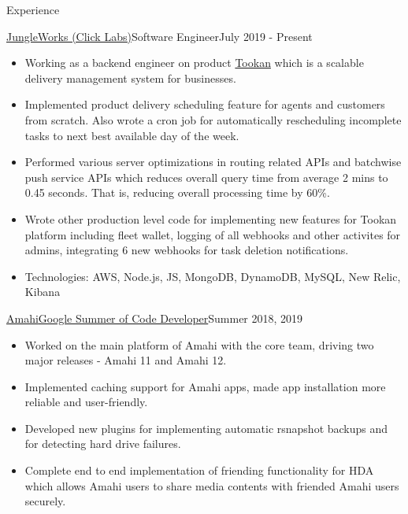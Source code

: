 \documentclass[]{mcdowellcv}
\begin{document}
	\makeheader
	
	\begin{cvsection}{Experience}
	    \begin{cvsubsection}{\href {https://jungleworks.com/}{JungleWorks (Click Labs)}}{Software Engineer}{July 2019 - Present}
			\begin{itemize}
				\item Working as a backend engineer on product \href {https://jungleworks.com/tookan/}{Tookan} which is a scalable delivery management system for businesses.
                \item Implemented product delivery scheduling feature for agents and customers from scratch. Also wrote a cron job for automatically rescheduling incomplete tasks to next best available day of the week.
                \item Performed various server optimizations in routing related APIs and batchwise push service APIs which reduces overall query time from average 2 mins to 0.45 seconds. That is, reducing overall processing time by 60\%.
                \item Wrote other production level code for implementing new features for Tookan platform including fleet wallet, logging of all webhooks and other activites for admins, integrating 6 new webhooks for task deletion notifications. 
                \item Technologies: AWS, Node.js, JS, MongoDB, DynamoDB, MySQL, New Relic, Kibana
			\end{itemize}
		\end{cvsubsection}
		\begin{cvsubsection}{\href {https://www.amahi.org/}{Amahi}}{\href {https://summerofcode.withgoogle.com/}{Google Summer of Code Developer}}{Summer 2018, 2019}
			\begin{itemize}
				\item Worked on the main platform of Amahi with the core team, driving two major releases - Amahi 11 and Amahi 12.
				\item Implemented caching support for Amahi apps, made app installation more reliable and user-friendly.
				\item Developed new plugins for implementing automatic rsnapshot backups and for detecting hard drive failures.
				\item Complete end to end implementation of friending functionality for HDA which allows Amahi users to share media contents with friended Amahi users securely.

\end{itemize}
\end{cvsubsection}
\end{cvsection}
\end{document}
